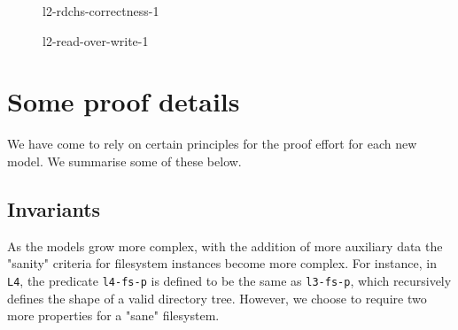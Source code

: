 \documentclass[runningheads,a4paper]{llncs}
\begin{document}
\begin{figure}
  \centering
  \caption{l2-rdchs-correctness-1}
  \label{l2-rdchs-correctness-1}
\end{figure}

\begin{figure}
  \centering
  \caption{l2-read-over-write-1}
  \label{l2-read-over-write-1}
\end{figure}

\section{Some proof details}

We have come to rely on certain principles for the proof effort for
each new model. We summarise some of these below.

\subsection{Invariants}

As the models grow more complex, with the addition of more auxiliary
data the "sanity" criteria for filesystem instances become more
complex. For instance, in \texttt{L4}, the predicate \texttt{l4-fs-p}
is defined to be the same as \texttt{l3-fs-p}, which recursively
defines the shape of a valid directory tree. However, we choose to
require two more properties for a "sane" filesystem.
\end{document}

